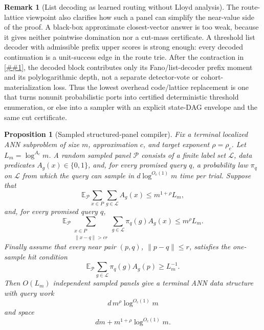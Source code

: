 \documentclass[10pt]{article}
\newcommand{\cref}[1]{\ref{##1}}
\newtheorem{proposition}[theorem]{Proposition}
\theoremstyle{definition}
\newtheorem{remark}[theorem]{Remark}
\newcommand{\E}{\mathbb{E}}
\begin{document}
\begin{remark}[List decoding as learned routing without Lloyd analysis]
   The route-lattice viewpoint also clarifies how such a panel can simplify the
   near-value side of the proof.  A black-box approximate closest-vector answer
   is too weak, because it gives neither pointwise domination nor a cut-mass
   certificate.  A threshold list decoder with admissible prefix upper scores
   is strong enough: every decoded continuation is a unit-success edge in the
   route trie.  After the contraction in
   \cref{lem:port-skeleton-saturated-comparison}, the decoded block contributes
   only its Fano/list-decoder prefix moment and its polylogarithmic depth, not a
   separate detector-vote or cohort-materialization loss.  Thus the lowest
   overhead code/lattice replacement is one that turns nonunit probabilistic
   ports into certified deterministic threshold enumeration, or else into a
   sampler with an explicit state-DAG envelope and the same cut certificate.
\end{remark}

\begin{proposition}[Sampled structured-panel compiler]
   \label{prop:sampled-structured-panel}
   Fix a terminal localized ANN subproblem of size \(m\), approximation \(c\),
   and target exponent \(\rho=\rho_c\).  Let \(L_m=\log^{A_c}m\).  A random
   sampled panel \(\mathcal P\) consists of a finite label set \(\mathcal L\),
   data predicates \(A_g(x)\in\{0,1\}\), and, for every promised query \(q\),
   a probability law \(\pi_q\) on \(\mathcal L\) from which the query can sample in
   \(d\log^{O_c(1)}m\) time per trial.  Suppose that
   \[
      \E_{\mathcal P}\sum_{x\in P}\sum_{g\in\mathcal L}A_g(x)
      \le m^{1+\rho}L_m ,
      \tag{SP1}
   \]
   and, for every promised query \(q\),
   \[
      \E_{\mathcal P}
      \sum_{\substack{x\in P\\ \|x-q\|>cr}}
      \sum_{g\in\mathcal L}\pi_q(g)A_g(x)
      \le m^\rho L_m .
      \tag{SP2}
   \]
   Finally assume that every near pair \((p,q)\), \(\|p-q\|\le r\), satisfies
   the one-sample hit condition
   \[
      \E_{\mathcal P}
      \sum_{g\in\mathcal L}\pi_q(g)A_g(p)
      \ge L_m^{-1}.
      \tag{SP3}
   \]
   Then \(O(L_m)\) independent sampled panels give a terminal ANN data
   structure with query work
   \[
      d\,m^\rho\log^{O_c(1)}m
   \]
   and space
   \[
      dm+m^{1+\rho}\log^{O_c(1)}m .
   \]
\end{proposition}
\end{document}
